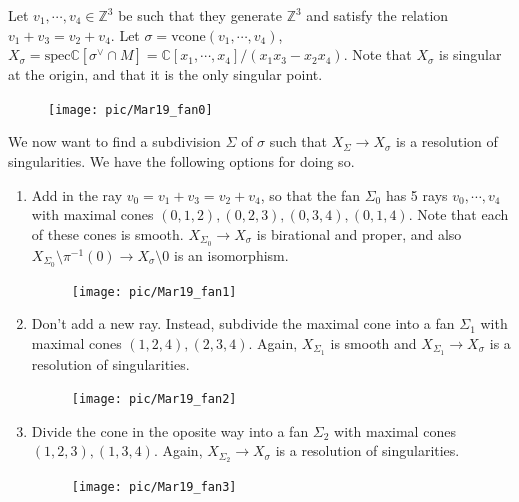 \documentclass[a4paper,12pt]{amsart}
\newcommand{\ZZ}{\mathbb{Z}}
\newcommand{\CC}{\mathbb{C}}
\begin{document}
\begin{example}
	Let $v_1,\cdots,v_4\in\ZZ^3$ be such that they generate $\ZZ^3$ and satisfy the relation $v_1+v_3=v_2+v_4$. Let $\sigma=\text{vcone}(v_1,\cdots,v_4)$, $X_\sigma=\text{spec}\CC[\sigma^\vee\cap M]=\CC[x_1,\cdots,x_4]/(x_1x_3-x_2x_4)$. Note that $X_\sigma$ is singular at the origin, and that it is the only singular point.
\end{example}

\begin{figure}[h]
	\centering
	\texttt{[image: pic/Mar19\_fan0]}
\end{figure}

We now want to find a subdivision $\Sigma$ of $\sigma$ such that $X_{\Sigma}\rightarrow X_\sigma$ is a resolution of singularities. We have the following options for doing so.
\begin{enumerate}
	\item  Add in the ray $v_0=v_1+v_3=v_2+v_4$, so that the fan $\Sigma_0$ has 5 rays $v_0,\cdots,v_4$ with maximal cones $(0,1,2),(0,2,3),(0,3,4),(0,1,4)$.
	Note that each of these cones is smooth. $X_{\Sigma_0}\rightarrow X_\sigma$ is birational and proper, and also $X_{\Sigma_0}\setminus\pi^{-1}(0)\rightarrow X_\sigma\setminus0$ is an isomorphism.
	
	\begin{figure}[h]
		\centering
		\texttt{[image: pic/Mar19\_fan1]}
	\end{figure}
	
	\item Don't add a new ray. Instead, subdivide the maximal cone into a fan $\Sigma_1$ with maximal cones $(1,2,4),(2,3,4)$. Again, $X_{\Sigma_1}$ is smooth and $X_{\Sigma_1}\rightarrow X_\sigma$ is a resolution of singularities.
	
	\begin{figure}[h]
		\centering
		\texttt{[image: pic/Mar19\_fan2]}
	\end{figure}
	\vspace{3cm}
	
	\item Divide the cone in the oposite way into a fan $\Sigma_2$ with maximal cones $(1,2,3),(1,3,4)$. Again, $X_{\Sigma_2}\rightarrow X_\sigma$ is a resolution of singularities.
	
	\begin{figure}[h]
		\centering
		\texttt{[image: pic/Mar19\_fan3]}
	\end{figure}
\end{enumerate}
\end{document}
